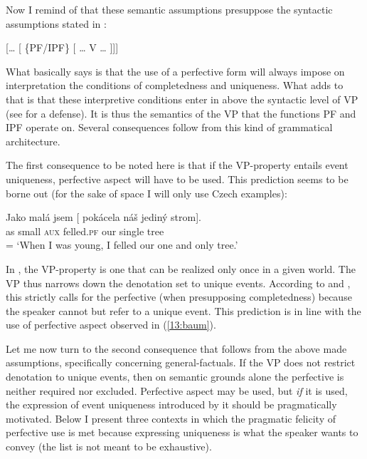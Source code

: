 \documentclass[output=paper,
modfonts,
newtxmath,
hidelinks
]{langscibook}
\begin{document}
\noindent Now I remind of that these semantic assumptions presuppose the syntactic assumptions stated in :

\begin{exe}
\ex\label{13:synas}
{} [{\dots} [ \{PF/IPF\} [ {\dots} V {\dots} ]]]
\end{exe}

\noindent What  basically says is that the use of a perfective form will always impose on interpretation the conditions of completedness
and uniqueness. What  adds to that is that these interpretive conditions enter in above the syntactic level of VP (see \citealt{Tate11,Tate13} for a defense). It is thus the semantics of the VP that the functions PF and IPF operate on. Several consequences follow from this kind of grammatical architecture.

The first consequence to be noted here is that if the VP-property entails event uniqueness, perfective aspect will have to be used.
This prediction seems to be borne out (for the sake of space I will only use Czech examples):

\begin{exe}
\ex\label{13:baum}
\gll Jako mal\'a jsem [ pok\'acela n\'a\v{s} jedin\'y strom].\\
as small \textsc{aux} {} felled.\textsc{pf} our single tree \\\hfill = 
\glt `When I was young, I felled our one and only tree.'
\end{exe}

\noindent In , the VP-property is one that can be realized only once in a given world. The VP thus narrows down the denotation set to unique events. According to  and , this strictly calls for the perfective (when presupposing completedness) because the speaker cannot but refer to a unique event. This prediction is in line with the use of perfective aspect observed in (\ref{13:baum}).


Let me now turn to the second consequence that follows from the above made assumptions, specifically concerning general-factuals. If the VP does not restrict denotation to unique events, then on semantic grounds alone the perfective is neither required nor excluded. Perfective aspect may be used, but \textit{if} it is used, the expression of event uniqueness introduced by it should be pragmatically motivated. Below I present three contexts in which the pragmatic felicity of perfective use is met because expressing uniqueness is what the speaker wants to convey (the list is not meant to be exhaustive).
\end{document}
